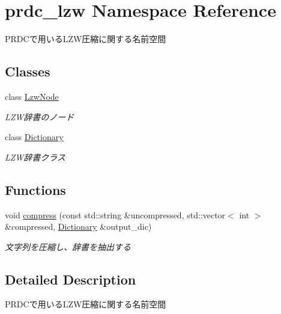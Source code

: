 \hypertarget{namespaceprdc__lzw}{\section{prdc\-\_\-lzw Namespace Reference}
\label{namespaceprdc__lzw}
}


P\-R\-D\-Cで用いる\-L\-Z\-W圧縮に関する名前空間  


\subsection*{Classes}
\begin{DoxyCompactItemize}
\item 
class \hyperlink{classprdc__lzw_1_1LzwNode}{Lzw\-Node}
\begin{DoxyCompactList}\small\item\em L\-Z\-W辞書のノード \end{DoxyCompactList}\item 
class \hyperlink{classprdc__lzw_1_1Dictionary}{Dictionary}
\begin{DoxyCompactList}\small\item\em L\-Z\-W辞書クラス \end{DoxyCompactList}\end{DoxyCompactItemize}
\subsection*{Functions}
\begin{DoxyCompactItemize}
\item 
void \hyperlink{namespaceprdc__lzw_a09931e4cc68e675f2058ee251b1e761f}{compress} (const std\-::string \&uncompressed, std\-::vector$<$ int $>$ \&compressed, \hyperlink{classprdc__lzw_1_1Dictionary}{Dictionary} \&output\-\_\-dic)
\begin{DoxyCompactList}\small\item\em 文字列を圧縮し、辞書を抽出する \end{DoxyCompactList}\end{DoxyCompactItemize}


\subsection{Detailed Description}
P\-R\-D\-Cで用いる\-L\-Z\-W圧縮に関する名前空間 

